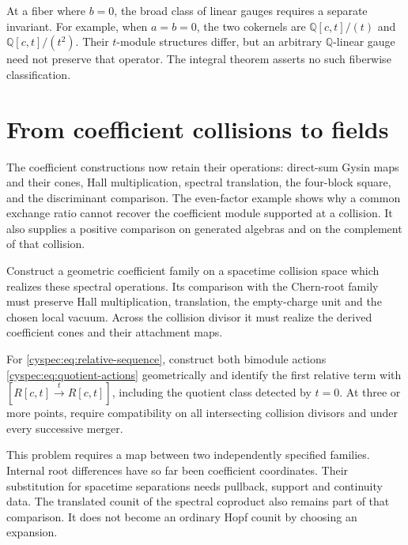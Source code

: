 At a fiber where $b=0$, the broad class of linear gauges requires
a separate invariant. For example, when $a=b=0$, the two cokernels
are $\mathbb Q[c,t]/(t)$ and $\mathbb Q[c,t]/(t^2)$.
Their $t$-module structures differ, but an arbitrary
$\mathbb Q$-linear gauge need not preserve that operator.
The integral theorem asserts no such fiberwise classification.

\section{From coefficient collisions to fields}
\label{cyspec:sec:realization}

The coefficient constructions now retain their operations:
direct-sum Gysin maps and their cones, Hall multiplication,
spectral translation, the four-block square, and the discriminant
comparison. The even-factor example shows why a common exchange
ratio cannot recover the coefficient module supported at a collision.
It also supplies a positive comparison on generated algebras and
on the complement of that collision.

\begin{problem}\label{cyspec:prob:field-realization}
Construct a geometric coefficient family on a spacetime collision
space which realizes these spectral operations. Its comparison with
the Chern-root family must preserve Hall multiplication, translation,
the empty-charge unit and the chosen local vacuum. Across the
collision divisor it must realize the derived coefficient cones
and their attachment maps.

For \eqref{cyspec:eq:relative-sequence}, construct both bimodule
actions \eqref{cyspec:eq:quotient-actions} geometrically and identify
the first relative term with $[R[c,t]\xrightarrow{t}R[c,t]]$,
including the quotient class detected by $t=0$.
At three or more points, require compatibility on all intersecting
collision divisors and under every successive merger.
\end{problem}

This problem requires a map between two independently specified
families. Internal root differences have so far been coefficient
coordinates. Their substitution for spacetime separations needs
pullback, support and continuity data. The translated counit of the
spectral coproduct also remains part of that comparison. It does
not become an ordinary Hopf counit by choosing an expansion.
